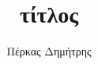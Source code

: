 \documentclass[12pt,a4paper]{article}
\begin{document}
\title{τίτλος}
\author{Πέρκας Δημήτρης}

\maketitle

\pagebreak


\tableofcontents
\newpage
\end{document}
